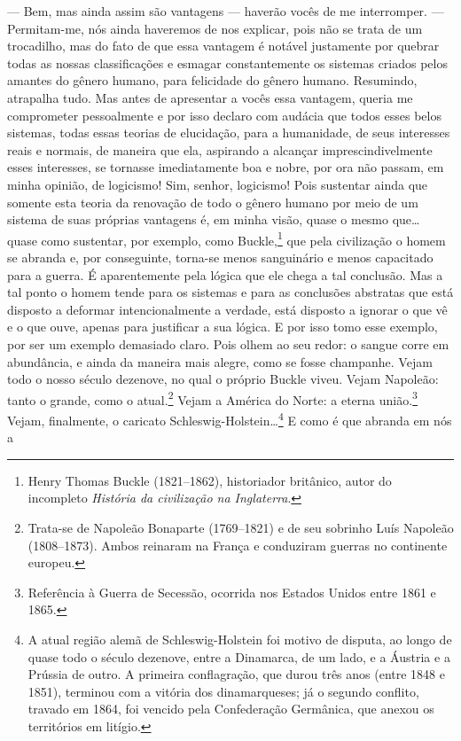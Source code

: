 --- Bem, mas ainda assim são vantagens --- haverão vocês de me interromper.
--- Permitam-me, nós ainda haveremos de nos explicar, pois não se trata de um
trocadilho, mas do fato de que essa vantagem é notável justamente por quebrar
todas as nossas classificações e esmagar constantemente os sistemas criados
pelos amantes do gênero humano, para felicidade do gênero humano. Resumindo,
atrapalha tudo. Mas antes de apresentar a vocês essa vantagem, queria me
comprometer pessoalmente e por isso declaro com audácia que todos esses belos
sistemas, todas essas teorias de elucidação, para a humanidade, de seus
interesses reais e normais, de maneira que ela, aspirando a alcançar
imprescindivelmente esses interesses, se tornasse imediatamente boa e nobre,
por ora não passam, em minha opinião, de logicismo! Sim, senhor, logicismo! Pois
sustentar ainda que somente esta teoria da renovação de todo o gênero humano
por meio de um sistema de suas próprias vantagens é, em minha visão, quase o
mesmo que\ldots{} quase como sustentar, por exemplo, como Buckle,\footnote{
Henry Thomas Buckle (1821--1862), historiador britânico, autor do incompleto
\textit{História da civilização na Inglaterra}.} que pela civilização o homem
se abranda e, por conseguinte, torna-se menos sanguinário e menos capacitado
para a guerra. É aparentemente pela lógica que ele chega a tal conclusão. Mas a
tal ponto o homem tende para os sistemas e para as conclusões abstratas que
está disposto a deformar intencionalmente a verdade, está disposto a ignorar o
que vê e o que ouve, apenas para justificar a sua lógica. E por isso tomo esse
exemplo, por ser um exemplo demasiado claro. Pois olhem ao seu redor: o sangue
corre em abundância, e ainda da maneira mais alegre, como se fosse champanhe.
Vejam todo o nosso século  dezenove, no qual o próprio Buckle viveu. Vejam Napoleão:
tanto o grande, como o atual.\footnote{ Trata-se de Napoleão Bonaparte
(1769--1821) e de seu sobrinho Luís Napoleão (1808--1873). Ambos reinaram na
França e conduziram guerras no continente europeu.} Vejam a América do Norte: a
eterna união.\footnote{ Referência à Guerra de Secessão, ocorrida nos Estados
Unidos entre 1861 e 1865.} Vejam, finalmente, o caricato
Schleswig-Holstein\ldots{}\footnote{ A atual região alemã de Schleswig-Holstein
foi motivo de disputa, ao longo de quase todo o século  dezenove, entre a Dinamarca,
de um lado, e a Áustria e a Prússia de outro. A primeira conflagração, que
durou três anos (entre 1848 e 1851), terminou com a vitória dos dinamarqueses;
já o segundo conflito, travado em 1864, foi vencido pela Confederação
Germânica, que anexou os territórios em litígio.} E como é que abranda em nós a
